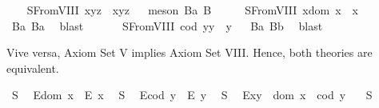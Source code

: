 \begin{isabellebody}
\endisatagproof
{\isafoldproof}%
%
\isadelimproof
%
\endisadelimproof
\isanewline
\ \ \isamarkupfalse%
\ S{}FromVIII{\isacharcolon}\ {\isachardoublequoteopen}x{\isasymcdot}{\isacharparenleft}y{\isasymcdot}z{\isacharparenright}\ {\isasymcong}\ {\isacharparenleft}x{\isasymcdot}y{\isacharparenright}{\isasymcdot}z{\isachardoublequoteclose}%
\isadelimproof
\ %
\endisadelimproof
%
\isatagproof
{}\isamarkupfalse%
\ {\isacharparenleft}meson\ B{}a\ B{}{\isacharparenright}%
\endisatagproof
{\isafoldproof}%
%
\isadelimproof
%
\endisadelimproof
\ \isanewline
\ \ \isamarkupfalse%
\ S{}FromVIII{\isacharcolon}\ {\isachardoublequoteopen}x{\isasymcdot}{\isacharparenleft}dom\ x{\isacharparenright}\ {\isasymcong}\ x{\isachardoublequoteclose}%
\isadelimproof
\ %
\endisadelimproof
%
\isatagproof
{}\isamarkupfalse%
\ B{}a\ B{}a\ \isamarkupfalse%
\ blast%
\endisatagproof
{\isafoldproof}%
%
\isadelimproof
%
\endisadelimproof
\ \ \isanewline
\ \ \isamarkupfalse%
\ S{}FromVIII{\isacharcolon}\ {\isachardoublequoteopen}{\isacharparenleft}cod\ y{\isacharparenright}{\isasymcdot}y\ {\isasymcong}\ y{\isachardoublequoteclose}%
\isadelimproof
\ %
\endisadelimproof
%
\isatagproof
{}\isamarkupfalse%
\ B{}a\ B{}b\ \isamarkupfalse%
\ blast%
\endisatagproof
{\isafoldproof}%
%
\isadelimproof
%
\endisadelimproof
%
\begin{isamarkuptext}%
Vive versa, Axiom Set V implies Axiom Set VIII. Hence, both theories are equivalent.%
\end{isamarkuptext}\isamarkuptrue%
\ S{}{\isacharcolon}\ %
\ {\isachardoublequoteopen}E{\isacharparenleft}dom\ x{\isacharparenright}\ \isactrlbold {\isasymrightarrow}\ E\ x{\isachardoublequoteclose}\ \isanewline
\ S{}{\isacharcolon}\ %
\ {\isachardoublequoteopen}E{\isacharparenleft}cod\ y{\isacharparenright}\ \isactrlbold {\isasymrightarrow}\ E\ y{\isachardoublequoteclose}\ \isanewline
\ S{}{\isacharcolon}\ %
\ {\isachardoublequoteopen}E{\isacharparenleft}x{\isasymcdot}y{\isacharparenright}\ \isactrlbold {\isasymleftrightarrow}\ dom\ x\ {\isasymsimeq}\ cod\ y{\isachardoublequoteclose}\ \ \isanewline
\ S{}{\isacharcolon}\ %
\end{isabellebody}
